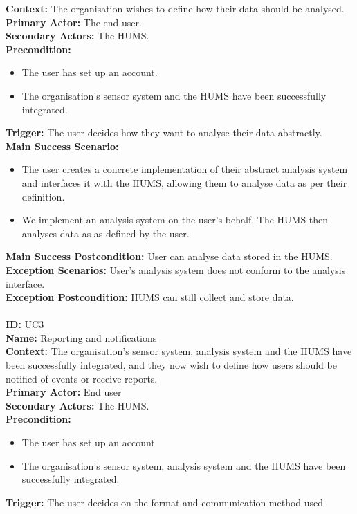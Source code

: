 \documentclass[10pt,a4paper]{article}
\begin{document}
\textbf{Context:} The organisation wishes to define how their data should be
analysed.\\
\textbf{Primary Actor:} The end user.\\
\textbf{Secondary Actors:} The HUMS.\\
\textbf{Precondition:}
\begin{itemize}
\item The user has set up an account.
\item The organisation's sensor system and the HUMS have been successfully
integrated.
\end{itemize}
\textbf{Trigger:} The user decides how they want to analyse their data
abstractly.\\
\textbf{Main Success Scenario:}
\begin{itemize}
\item The user creates a concrete implementation of their abstract analysis
system and interfaces it with the HUMS, allowing them to analyse data as per
their definition.
\item We implement an analysis system on the user's behalf. The HUMS then
analyses data as as defined by the user.
\end{itemize}
\textbf{Main Success Postcondition:} User can analyse data stored in the HUMS.\\
\textbf{Exception Scenarios:} User's analysis system does not conform to the
analysis interface.\\
\textbf{Exception Postcondition:} HUMS can still collect and store data.\\\\
\noindent \textbf{ID:} UC3\\
\textbf{Name:} Reporting and notifications\\
\textbf{Context:} The organisation's sensor system, analysis system and the HUMS
have been successfully integrated, and they now wish to define how users should
be notified of events or receive reports.\\
\textbf{Primary Actor:} End user\\
\textbf{Secondary Actors:} The HUMS.\\
\textbf{Precondition:}
\begin{itemize}
\item The user has set up an account
\item The organisation's sensor system, analysis system and the HUMS have been
successfully integrated.
\end{itemize}
\textbf{Trigger:} The user decides on the format and communication method used
\end{document}
